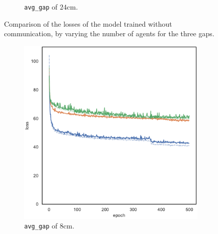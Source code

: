 \begin{figure}[!htb]
\begin{center}
\begin{subfigure}[h]{0.32\textwidth}
			\caption{\texttt{avg\_gap} of $24$\gls{cm}.}
		\end{subfigure}
	\end{center}
	\vspace{-0.5cm}
	\caption[Losses summary of the second set of experiments (no 
	communication).]{Comparison of the losses of the model trained without 
		communication, by varying the number of agents for the three gaps.}
	\label{fig:distlossgapsexte}
\end{figure}
\begin{figure}[!htb]
	\begin{center}
		\begin{subfigure}[h]{0.32\textwidth}
			\includegraphics[width=\textwidth]{contents/images/task1-comm-extension/loss-communication-gap_8@copy}%
			\caption{\texttt{avg\_gap} of $8$\gls{cm}.}
		\end{subfigure}
		\hfill
		\begin{subfigure}[h]{0.32\textwidth}

\end{subfigure}
\end{center}
\end{figure}

